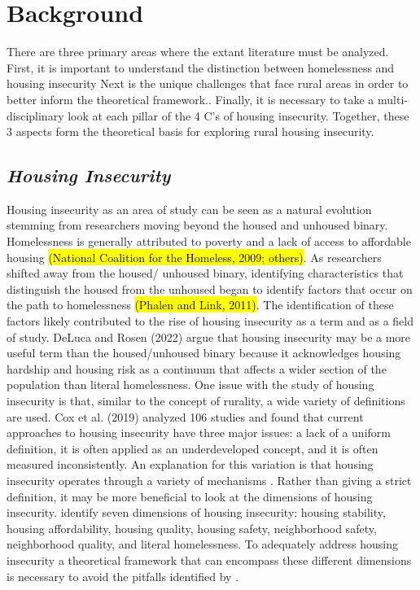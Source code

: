 \chapter{Background}	%
 There are three primary areas  where the extant literature must be analyzed. First,  it is important to understand the distinction between homelessness and housing insecurity Next is the unique challenges that face rural areas in order to better inform the theoretical framework.. Finally, it is necessary to take a multi-disciplinary look at each pillar of the 4 C's of housing insecurity. Together, these 3 aspects form the theoretical basis for exploring rural housing insecurity.

\section{\textit{Housing Insecurity}}

Housing insecurity as an area of study can be seen as a natural evolution stemming from researchers moving beyond the housed and unhoused binary.  Homelessness is generally attributed to poverty and a lack of access to affordable housing \hl{(National Coalition for the Homeless, 2009; others)}.  As researchers shifted away from the housed/ unhoused binary, identifying characteristics that distinguish the housed from the unhoused began to identify factors that occur on the path to homelessness \hl{(Phalen and Link, 2011)}.  The identification of these factors likely contributed to the rise of housing insecurity as a term and as a field of study.  DeLuca and Rosen (2022) argue that housing insecurity may be a more useful term than the housed/unhoused binary because it acknowledges housing hardship and housing risk as a continuum that affects a wider section of the population than literal homelessness.  One issue with the study of housing insecurity is that, similar to the concept of rurality, a wide variety of definitions are used. Cox et al. (2019) analyzed 106 studies and found that current approaches to housing insecurity have three major issues: a lack of a uniform definition, it is often applied as an underdeveloped concept, and it is often measured inconsistently. An explanation for this variation is that housing insecurity operates through a variety of mechanisms \citep{leifheit_building_2022}.  Rather than giving a strict definition, it may be more beneficial to look at the dimensions of housing insecurity. \citet{cox_road_2019} identify seven dimensions of housing insecurity: housing stability, housing affordability, housing quality, housing safety, neighborhood safety, neighborhood quality, and literal homelessness. To adequately address housing insecurity a theoretical framework that can encompass these different dimensions is necessary to avoid the pitfalls identified by \citet{cox_road_2019}. %


